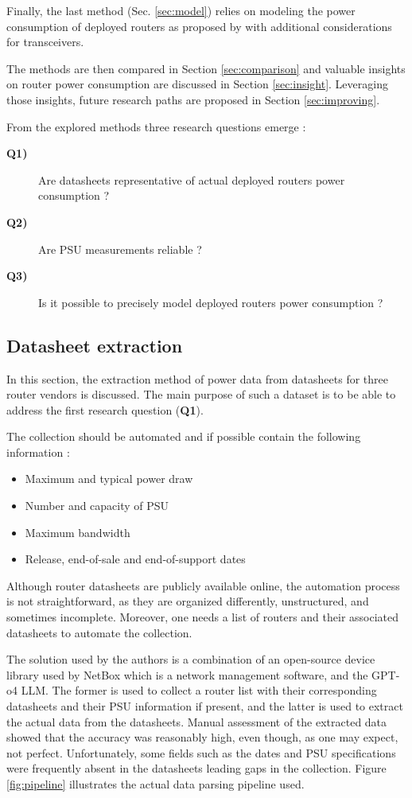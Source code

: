 Finally, the last method (Sec. \ref{sec:model}) relies on modeling the power consumption of deployed routers as proposed by \cite{35} with additional considerations for transceivers. 

The methods are then compared in Section \ref{sec:comparison} and valuable insights on router power consumption are discussed in Section \ref{sec:insight}.  
Leveraging those insights, future research paths are proposed in Section \ref{sec:improving}.

From the explored methods three research questions emerge :
{
\hfuzz 2781pt 
\begin{description}
	\item [\textbf{Q1)}] Are datasheets representative of actual deployed routers power consumption ? 
	\item [\textbf{Q2)}] Are PSU measurements reliable ?
	\item [\textbf{Q3)}] Is it possible to precisely model deployed routers power consumption ? 
\end{description}
}

\subsection{Datasheet extraction}\label{sec:datasheet} 
In this section, the extraction method of power data from datasheets for three router vendors is discussed.
The main purpose of such a dataset is to be able to address the first research question (\textbf{Q1}).

The collection should be automated and if possible contain the following information :   
\begin{itemize}
	\item Maximum and typical power draw
	\item Number and capacity of PSU
	\item Maximum bandwidth
	\item Release, end-of-sale and end-of-support dates 
\end{itemize}
Although router datasheets are publicly available online, the automation process is not straightforward, as they are organized differently, unstructured, and sometimes incomplete. 
Moreover, one needs a list of routers and their associated datasheets to automate the collection. 

The solution used by the authors is a combination of an open-source device library \cite{NetBoxLib} used by NetBox which is a network management software, and the GPT-o4 LLM. 
The former is used to collect a router list with their corresponding datasheets and their PSU information if present, and the latter is used to extract the actual data from the datasheets.
Manual assessment of the extracted data showed that the accuracy was reasonably high, even though, as one may expect, not perfect. 
Unfortunately, some fields such as the dates and PSU specifications were frequently absent in the datasheets leading gaps in the collection.   
Figure \ref{fig:pipeline} illustrates the actual data parsing pipeline used.

